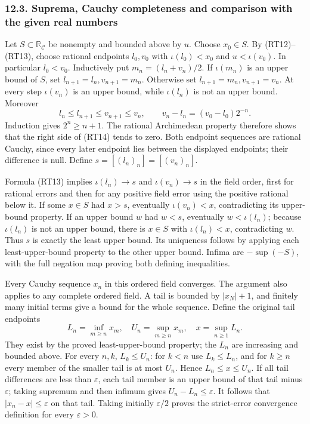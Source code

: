 \documentclass[
  11pt,
]{article}
\begin{document}
\subsubsection{12.3. Suprema, Cauchy completeness and comparison with
the given real
numbers}\label{suprema-cauchy-completeness-and-comparison-with-the-given-real-numbers}

Let \(S\subset\mathbb R_{\mathcal C}\) be nonempty and bounded above by
\(u\). Choose \(x_0\in S\). By (RT12)--(RT13), choose rational endpoints
\(l_0,v_0\) with \(\iota(l_0)<x_0\) and \(u<\iota(v_0)\). In particular
\(l_0<v_0\). Inductively put \(m_n=(l_n+v_n)/2\). If \(\iota(m_n)\) is
an upper bound of \(S\), set \(l_{n+1}=l_n,v_{n+1}=m_n\). Otherwise set
\(l_{n+1}=m_n,v_{n+1}=v_n\). At every step \(\iota(v_n)\) is an upper
bound, while \(\iota(l_n)\) is not an upper bound. Moreover \[
l_n\le l_{n+1}\le v_{n+1}\le v_n,\qquad
v_n-l_n=(v_0-l_0)2^{-n}.
\tag{RT14}
\] Induction gives \(2^n\ge n+1\). The rational Archimedean property
therefore shows that the right side of (RT14) tends to zero. Both
endpoint sequences are rational Cauchy, since every later endpoint lies
between the displayed endpoints; their difference is null. Define
\(s=[(l_n)_n]=[(v_n)_n]\).

Formula (RT13) implies \(\iota(l_n)\to s\) and \(\iota(v_n)\to s\) in
the field order, first for rational errors and then for any positive
field error using the positive rational below it. If some \(x\in S\) had
\(x>s\), eventually \(\iota(v_n)<x\), contradicting its upper-bound
property. If an upper bound \(w\) had \(w<s\), eventually
\(w<\iota(l_n)\); because \(\iota(l_n)\) is not an upper bound, there is
\(x\in S\) with \(\iota(l_n)<x\), contradicting \(w\). Thus \(s\) is
exactly the least upper bound. Its uniqueness follows by applying each
least-upper-bound property to the other upper bound. Infima are
\(-\sup(-S)\), with the full negation map proving both defining
inequalities.

Every Cauchy sequence \(x_n\) in this ordered field converges. The
argument also applies to any complete ordered field. A tail is bounded
by \(|x_N|+1\), and finitely many initial terms give a bound for the
whole sequence. Define the original tail endpoints \[
L_n=\inf_{m\ge n}x_m,\quad U_n=\sup_{m\ge n}x_m,\quad
x=\sup_{n\ge1}L_n.
\tag{RT15}
\] They exist by the proved least-upper-bound property; the \(L_n\) are
increasing and bounded above. For every \(n,k\), \(L_k\le U_n\): for
\(k<n\) use \(L_k\le L_n\), and for \(k\ge n\) every member of the
smaller tail is at most \(U_n\). Hence \(L_n\le x\le U_n\). If all tail
differences are less than \(\varepsilon\), each tail member is an upper
bound of that tail minus \(\varepsilon\); taking supremum and then
infimum gives \(U_n-L_n\le\varepsilon\). It follows that
\(|x_n-x|\le\varepsilon\) on that tail. Taking initially
\(\varepsilon/2\) proves the strict-error convergence definition for
every \(\varepsilon>0\).
\end{document}
